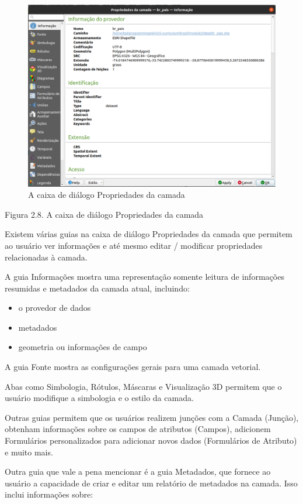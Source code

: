 \documentclass[
]{book}
\providecommand{\tightlist}{%
  \setlength{\itemsep}{0pt}\setlength{\parskip}{0pt}}
\begin{document}
\begin{figure}
\centering
\includegraphics{media/modulo2/layer-properties.png}
\caption{A caixa de diálogo Propriedades da camada}
\end{figure}

Figura 2.8. A caixa de diálogo Propriedades da camada

Existem várias guias na caixa de diálogo Propriedades da camada que permitem ao usuário ver informações e até mesmo editar / modificar propriedades relacionadas à camada.

A guia Informações mostra uma representação somente leitura de informações resumidas e metadados da camada atual, incluindo:

\begin{itemize}
\tightlist
\item
  o provedor de dados
\item
  metadados
\item
  geometria ou informações de campo
\end{itemize}

A guia Fonte mostra as configurações gerais para uma camada vetorial.

Abas como Simbologia, Rótulos, Máscaras e Visualização 3D permitem que o usuário modifique a simbologia e o estilo da camada.

Outras guias permitem que os usuários realizem junções com a Camada (Junção), obtenham informações sobre os campos de atributos (Campos), adicionem Formulários personalizados para adicionar novos dados (Formulários de Atributo) e muito mais.

Outra guia que vale a pena mencionar é a guia Metadados, que fornece ao usuário a capacidade de criar e editar um relatório de metadados na camada. Isso inclui informações sobre:
\end{document}
